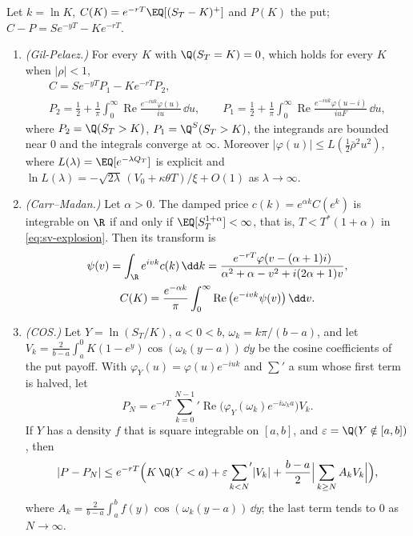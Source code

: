 \begin{proposition}\label{prop:sv-fourier}
Let $k=\ln K$, $C(K)=e^{-rT}\EQ[(S_T-K)^+]$ and $P(K)$ the put; $C-P=Se^{-yT}-Ke^{-rT}$.
\begin{enumerate}[label=(\roman*)]
  \item \emph{(Gil-Pelaez.)} For every $K$ with $\Q(S_T=K)=0$, which holds for every $K$ when $|\rho|<1$,
    \begin{equation}\label{eq:sv-gp}
    \begin{gathered}
      C=Se^{-yT}P_1-Ke^{-rT}P_2,\\
      P_2=\frac12+\frac1\pi\int_0^\infty\operatorname{Re}\frac{e^{-iuk}\varphi(u)}{iu}\,\dd u,\qquad
      P_1=\frac12+\frac1\pi\int_0^\infty\operatorname{Re}\frac{e^{-iuk}\varphi(u-i)}{iuF}\,\dd u,
    \end{gathered}
    \end{equation}
    where $P_2=\Q(S_T>K)$, $P_1=\Q^S(S_T>K)$, the integrands are bounded near $0$ and the integrals converge
    at $\infty$. Moreover $|\varphi(u)|\le L(\frac12\bar\rho^2u^2)$, where $L(\lambda)=\EQ[e^{-\lambda Q_T}]$ is
    explicit and $\ln L(\lambda)=-\sqrt{2\lambda}\,(V_0+\kappa\theta T)/\xi+O(1)$ as $\lambda\to\infty$.
  \item \emph{(Carr--Madan.)} Let $\alpha>0$. The damped price $c(k)=e^{\alpha k}C(e^k)$ is integrable on $\R$ if and
    only if $\EQ[S_T^{1+\alpha}]<\infty$, that is, $T<T^*(1+\alpha)$ in \eqref{eq:sv-explosion}. Then its
    transform is
    \begin{equation}\label{eq:sv-cm}
    \begin{gathered}
      \psi(v)=\int_\R e^{ivk}c(k)\,\dd k=\frac{e^{-rT}\varphi(v-(\alpha+1)i)}{\alpha^2+\alpha-v^2+i(2\alpha+1)v},\\
      C(K)=\frac{e^{-\alpha k}}{\pi}\int_0^\infty\operatorname{Re}\big(e^{-ivk}\psi(v)\big)\,\dd v .
    \end{gathered}
    \end{equation}
  \item \emph{(COS.)} Let $Y=\ln(S_T/K)$, $a<0<b$, $\omega_k=k\pi/(b-a)$, and let
    $V_k=\frac2{b-a}\int_a^0K(1-e^y)\cos(\omega_k(y-a))\,\dd y$ be the cosine coefficients of the put payoff.
    With $\varphi_Y(u)=\varphi(u)e^{-iuk}$ and $\sum'$ a sum whose first term is halved, let
    \[
      P_N=e^{-rT}\,{\sum_{k=0}^{N-1}}'\operatorname{Re}\big(\varphi_Y(\omega_k)e^{-i\omega_ka}\big)V_k .
    \]
    If $Y$ has a density $f$ that is square integrable on $[a,b]$, and $\varepsilon=\Q(Y\notin[a,b])$, then
    \begin{equation}\label{eq:sv-cos-error}
      |P-P_N|\le e^{-rT}\Big(K\,\Q(Y<a)+\varepsilon\,{\sum_{k<N}}'|V_k|+\frac{b-a}2\Big|\sum_{k\ge N}A_kV_k\Big|\Big),
    \end{equation}
    where $A_k=\frac2{b-a}\int_a^bf(y)\cos(\omega_k(y-a))\,\dd y$; the last term tends to $0$ as $N\to\infty$.
\end{enumerate}
\end{proposition}

